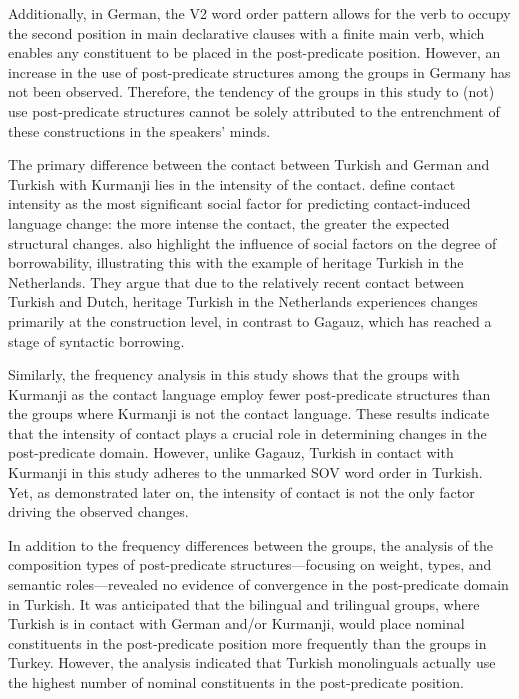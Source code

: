 Additionally, in German, the V2 word order pattern allows for the verb to occupy the second position in main declarative clauses with a finite main verb, which enables any constituent to be placed in the post-predicate position. However, an increase in the use of post-predicate structures among the groups in Germany has not been observed. Therefore, the tendency of the groups in this study to (not) use post-predicate structures cannot be solely attributed to the entrenchment of these constructions in the speakers' minds.

The primary difference between the contact between Turkish and German and Turkish with Kurmanji lies in the intensity of the contact. \citet{ThomasonKaufman1988} define contact intensity as the most significant social factor for predicting contact-induced language change: the more intense the contact, the greater the expected structural changes. \citet{DogruozBackus2007} also highlight the influence of social factors on the degree of borrowability, illustrating this with the example of heritage Turkish in the Netherlands. They argue that due to the relatively recent contact between Turkish and Dutch, heritage Turkish in the Netherlands experiences changes primarily at the construction level, in contrast to Gagauz, which has reached a stage of syntactic borrowing.

Similarly, the frequency analysis in this study shows that the groups with Kurmanji as the contact language employ fewer post-predicate structures than the groups where Kurmanji is not the contact language. These results indicate that the intensity of contact plays a crucial role in determining changes in the post-predicate domain. However, unlike Gagauz, Turkish in contact with Kurmanji in this study adheres to the unmarked SOV word order in Turkish. Yet, as demonstrated later on, the intensity of contact is not the only factor driving the observed changes.

In addition to the frequency differences between the groups, the analysis of the composition types of post-predicate structures—focusing on weight, types, and semantic roles—revealed no evidence of convergence in the post-predicate domain in Turkish. It was anticipated that the bilingual and trilingual groups, where Turkish is in contact with German and/or Kurmanji, would place nominal constituents in the post-predicate position more frequently than the groups in Turkey. However, the analysis indicated that Turkish monolinguals actually use the highest number of nominal constituents in the post-predicate position.


